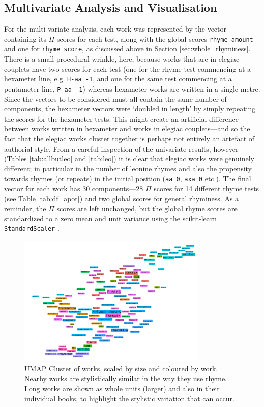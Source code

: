 \documentclass[twocolumn, switch, a4paper]{article} %
\begin{document}
\subsection{Multivariate Analysis and Visualisation}

For the multi-variate analysis, each work was represented by the vector
containing its $\Pi$ scores for each test, along with the global scores
\texttt{rhyme amount} and one for \texttt{rhyme score}, as discussed above in
Section \ref{sec:whole_rhyminess}. There is a small procedural wrinkle, here,
because works that are in elegiac couplets have two scores for each test (one
for the rhyme test commencing at a hexameter line, e.g. \texttt{H-aa -1}, and
one for the same test commencing at a pentameter line, \texttt{P-aa -1})
whereas hexameter works are written in a single metre. Since the vectors to be
considered must all contain the same number of components, the hexameter
vectors were `doubled in length' by simply repeating the scores for the
hexameter tests. This might create an artificial difference between works
written in hexameter and works in elegiac couplets---and so the fact that the
elegiac works cluster together is perhaps not entirely an artefact of
authorial style. From a careful inspection of the univariate results, however
(Tables \ref{tab:allbutleo} and \ref{tab:leo}) it is clear that elegiac works
were genuinely different; in particular in the number of leonine rhymes and
also the propensity towards rhymes (or repeats) in the initial position
(\texttt{aa 0}, \texttt{axa 0} etc.). The final vector for each work has 30
components---28 $\Pi$ scores for 14 different rhyme tests (see Table
\ref{tab:df_apot}) and two global scores for general rhyminess. As a reminder,
the $\Pi$ scores are left unchanged, but the global rhyme scores are
standardized to a zero mean and unit variance using the scikit-learn
\texttt{StandardScaler} \cite{scikit-learn}.

\begin{figure}[ht]
\caption{
  UMAP Cluster of works, scaled by size and coloured by work. Nearby works are
  stylistically similar in the way they use rhyme. Long works are shown as
  whole units (larger) and also in their individual books, to highlight the
  stylistic variation that can occur.
}
\label{fig:rhymecloud}
\centering
\includegraphics[width=0.8\textwidth]{rhyme_umap.pdf}
\end{figure}
\end{document}
